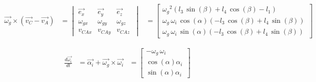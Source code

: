 \begin{equation*}
\begin{split}
\overrightarrow{\omega_{g}}\times(\overrightarrow{v_{C}}-\overrightarrow{v_{A}})
&=	\begin{vmatrix}
	\overrightarrow{e_{x}} & \overrightarrow{e_{y}} & \overrightarrow{e_{z}}\\
	\omega_{gx} & \omega_{gy} & \omega_{gz}\\
	v_{CAx} & v_{CAy} & v_{CAz}\
	\end{vmatrix}
&=	\begin{bmatrix}
{\omega_{g}}^{2} \left( l_{3}\,\sin \left( \beta \right) +l_{4}\,\cos \left( \beta \right) -l_{1} \right) \\
%
\omega_{g}\,\omega_{i}\,\cos \left( \alpha\right)  \left( -l_{3}\,\cos \left( \beta \right) +l_{4}\,\sin\left( \beta \right)  \right) \\
%
\omega_{g}\,\omega_{i}\,\sin \left( \alpha \right)  \left( -l_{3}\,\cos \left( \beta\right) +l_{4}\,\sin \left( \beta \right)  \right)\
\end{bmatrix}
\end{split}
\end{equation*}

\begin{equation*}
\begin{split}
\frac{d\overrightarrow{\omega_i}}{dt}
&=	\overrightarrow{\alpha_{i}}+\overrightarrow{\omega_{g}}\times\overrightarrow{\omega_{i}}
&=	\begin{bmatrix}
	-\omega_{g}\,\omega_{i}\\
	\cos \left( \alpha \right) \alpha_{i}\\
	\sin \left( \alpha \right) \alpha_{i}\
\end{bmatrix}
\end{split}
\end{equation*}

